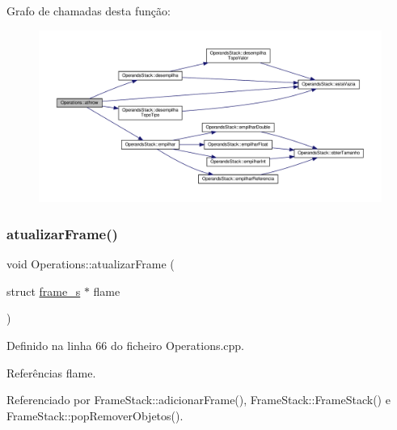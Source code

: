 Grafo de chamadas desta função\+:
\nopagebreak
\begin{figure}[H]
\begin{center}
\leavevmode
\includegraphics[width=350pt]{classOperations_a2a5eea0fb18391bb3854dfe55c8ac5d3_cgraph}
\end{center}
\end{figure}
\mbox{\label{classOperations_a4a846f964056932fdf4d63056bfbe322}} 
\subsubsection{\texorpdfstring{atualizar\+Frame()}{atualizarFrame()}}
{\footnotesize\ttfamily void Operations\+::atualizar\+Frame (\begin{DoxyParamCaption}\item[{struct \hyperlink{structframe__s}{frame\+\_\+s} $\ast$}]{flame }\end{DoxyParamCaption})\hspace{0.3cm}{\ttfamily [static]}}



Definido na linha 66 do ficheiro Operations.\+cpp.



Referências flame.



Referenciado por Frame\+Stack\+::adicionar\+Frame(), Frame\+Stack\+::\+Frame\+Stack() e Frame\+Stack\+::pop\+Remover\+Objetos().

\mbox{\label{classOperations_a96812e295c8429a32e09720d89cd0176}} 
